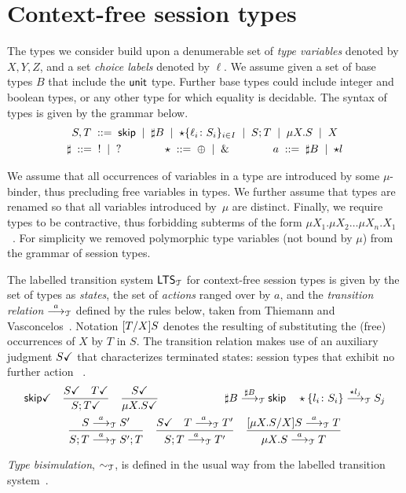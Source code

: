 \section{Context-free session types}
\label{sec:contextfreesession}

The types we consider build upon a denumerable set of \emph{type
  variables} denoted by $X,Y,Z$, and a set \emph{choice labels}
denoted by $\ell$. We assume given a set of base types $B$ that
include the $\unitk$ type. Further base types could include integer
and boolean types, or any other type for which equality is
decidable. The syntax of types is given by the grammar below.
%
\begin{gather*}
  S,T \grmeq \skipk \grmor \sharp B \grmor 
  \star\{\ell_i\colon S_i\}_{i\in I} \grmor S;T \grmor \mu X.S \grmor X
  \\
  \sharp \grmeq {}! \grmor {}? 
  \qquad \qquad
  \star  \grmeq \oplus \grmor {}\&
  \qquad \qquad
  a \grmeq \sharp B \grmor \star l %
\end{gather*}

We assume that all occurrences of variables in a type are introduced
by some $\mu$-binder, thus precluding free variables in types.
%
We further assume that types are renamed so that all variables
introduced by~$\mu$ are distinct.
%
Finally, we require types to be contractive, thus forbidding subterms
of the form
$\mu X_1.\mu X_2 \dots \mu
X_n. X_1$~\cite{DBLP:journals/tcs/Courcelle83,thiemann2016context}.
%
For simplicity we removed polymorphic type variables (not bound by
$\mu$) from the grammar of session types.

The labelled transition system $\LTSTypes$ for context-free session types is
given by the set of types as \emph{states}, the set of \emph{actions}
ranged over by $a$, and the \emph{transition relation} $\LTSderives$
defined by the rules below, taken from Thiemann and
Vasconcelos~\cite{thiemann2016context}.  Notation $\subs{T}{X}S$
denotes the resulting of substituting the (free) occurrences of $X$ by
$T$ in $S$. The transition relation makes use of an auxiliary judgment
$\DONE{S}$ that characterizes terminated states: session types that
exhibit no further action~\cite{DBLP:journals/jacm/AcetoH92} .
%
\begin{gather*}
  \DONE{\skipk}
  \quad
  \frac{\DONE{S} \quad \DONE{T}}{\DONE{S; T}}
  \quad
  \frac{\DONE S}{\DONE{\mu X.S}}
  \qquad \qquad \qquad
  \sharp B \LTSderives[\sharp B] \skipk
  \quad
  \star\{l_i\colon S_i\} \LTSderives[\star l_j] S_j
  \\
  \frac{S \LTSderives S'}{S; T \LTSderives S';T}
  \quad
  \frac{\DONE{S} \quad T \LTSderives T'}{S; T \LTSderives T'}
  \quad
  \frac{\subs{\mu X.S}{X}S \LTSderives T}{\mu X.S \LTSderives T}
\end{gather*}

\emph{Type bisimulation}, $\TypeEquiv$, is defined in the usual way from the
labelled transition system~\cite{sangiorgi2014introduction}.
\
